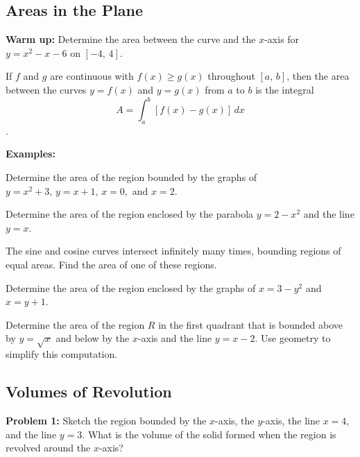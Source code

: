 \documentclass[addpoints, 12pt]{exam}
\begin{document}
\newpage
{}
\subsection*{Areas in the Plane}
\textbf{Warm up:} Determine the area between the curve and the $x$-axis for $y=x^2-x-6$ on $[-4,\,4].$

\begin{tcolorbox}[title= AREA IN THE PLANE, black,sharp corners,colback=white,colbacktitle=white,coltitle=black,boxrule=1pt]

     If $f$ and $g$ are continuous with $f(x)\ge g(x)$ throughout $[a,\,b]$, then the area between the curves $y=f(x)$ and $y=g(x)$ from $a$ to $b$ is the integral
     \[A=\int_a^b\left[f(x)-g(x)\right]\,dx\].
    
\end{tcolorbox}

\textbf{Examples:}
\begin{questions}
    \question Determine the area of the region bounded by the graphs of $y=x^2+3,\,y=x+1,\,x=0,$ and $x=2$.
    
    \question Determine the area of the region enclosed by the parabola $y=2-x^2$ and the line $y=x$.
    
    \newpage
    
    \question The sine and cosine curves intersect infinitely many times, bounding regions of equal areas. Find the area of one of these regions.
    
    \question Determine the area of the region enclosed by the graphs of $x=3-y^2$ and $x=y+1$.
    
    \question Determine the area of the region $R$ in the first quadrant that is bounded above by $y=\sqrt{x}$ and below by the $x$-axis and the line $y=x-2$. Use geometry to simplify this computation.
\end{questions}



\newpage
{}
\subsection*{Volumes of Revolution}
\textbf{Problem 1:} Sketch the region bounded by the $x$-axis, the $y$-axis, the line $x=4$, and the line $y=3$. What is the volume of the solid formed when the region is revolved around the $x$-axis?
\end{document}

